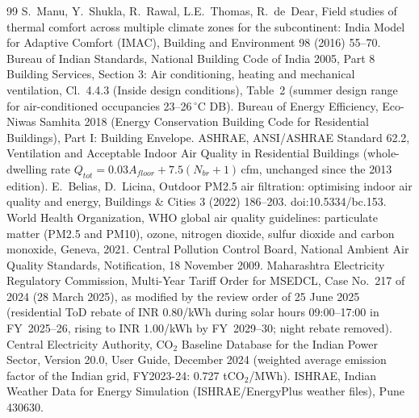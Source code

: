 \begin{thebibliography}{99}
 S.~Manu, Y.~Shukla, R.~Rawal, L.E.~Thomas, R.~de~Dear, Field studies of thermal comfort across multiple climate zones for the subcontinent: India Model for Adaptive Comfort (IMAC), Building and Environment 98 (2016) 55--70.
 Bureau of Indian Standards, National Building Code of India 2005, Part 8 Building Services, Section 3: Air conditioning, heating and mechanical ventilation, Cl.~4.4.3 (Inside design conditions), Table~2 (summer design range for air-conditioned occupancies 23--26\,$^\circ$C DB).
 Bureau of Energy Efficiency, Eco-Niwas Samhita 2018 (Energy Conservation Building Code for Residential Buildings), Part I: Building Envelope.
 ASHRAE, ANSI/ASHRAE Standard 62.2, Ventilation and Acceptable Indoor Air Quality in Residential Buildings (whole-dwelling rate $Q_{tot}=0.03A_{floor}+7.5(N_{br}+1)$\,cfm, unchanged since the 2013 edition).
 E.~Belias, D.~Licina, Outdoor PM2.5 air filtration: optimising indoor air quality and energy, Buildings \& Cities 3 (2022) 186--203. doi:10.5334/bc.153.
 World Health Organization, WHO global air quality guidelines: particulate matter (PM2.5 and PM10), ozone, nitrogen dioxide, sulfur dioxide and carbon monoxide, Geneva, 2021.
 Central Pollution Control Board, National Ambient Air Quality Standards, Notification, 18 November 2009.
 Maharashtra Electricity Regulatory Commission, Multi-Year Tariff Order for MSEDCL, Case No.~217 of 2024 (28 March 2025), as modified by the review order of 25 June 2025 (residential ToD rebate of INR 0.80/kWh during solar hours 09:00--17:00 in FY~2025--26, rising to INR 1.00/kWh by FY~2029--30; night rebate removed).
 Central Electricity Authority, CO$_2$ Baseline Database for the Indian Power Sector, Version 20.0, User Guide, December 2024 (weighted average emission factor of the Indian grid, FY2023-24: 0.727 tCO$_2$/MWh).
 ISHRAE, Indian Weather Data for Energy Simulation (ISHRAE/EnergyPlus weather files), Pune 430630.
\end{thebibliography}

